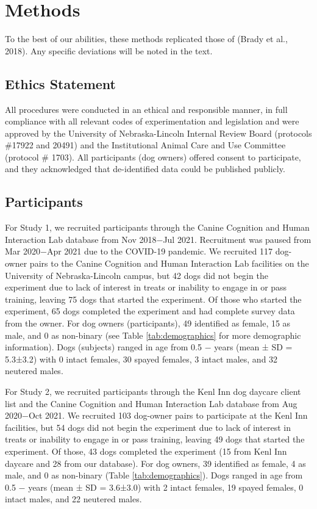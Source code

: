 \documentclass[
  pub,floatsintext]{apa6}
\begin{document}
\hypertarget{methods}{%
\section{Methods}\label{methods}}

To the best of our abilities, these methods replicated those of (Brady et al., 2018). Any specific deviations will be noted in the text.

\hypertarget{ethics-statement}{%
\subsection{Ethics Statement}\label{ethics-statement}}

All procedures were conducted in an ethical and responsible manner, in full compliance with all relevant codes of experimentation and legislation and were approved by the University of Nebraska-Lincoln Internal Review Board (protocols \#17922 and 20491) and the Institutional Animal Care and Use Committee (protocol \# 1703). All participants (dog owners) offered consent to participate, and they acknowledged that de-identified data could be published publicly.

\hypertarget{participants}{%
\subsection{Participants}\label{participants}}

For Study 1, we recruited participants through the Canine Cognition and Human Interaction Lab database from Nov 2018\(-\)Jul 2021. Recruitment was paused from Mar 2020\(-\)Apr 2021 due to the COVID-19 pandemic. We recruited 117 dog-owner pairs to the Canine Cognition and Human Interaction Lab facilities on the University of Nebraska-Lincoln campus, but 42 dogs did not begin the experiment due to lack of interest in treats or inability to engage in or pass training, leaving 75 dogs that started the experiment. Of those who started the experiment, 65 dogs completed the experiment and had complete survey data from the owner. For dog owners (participants), 49 identified as female, 15 as male, and 0 as non-binary (see Table \ref{tab:demographics} for more demographic information). Dogs (subjects) ranged in age from 0.5 \negthickspace \(-\)  years (mean ± SD = 5.3±3.2) with 0 intact females, 30 spayed females, 3 intact males, and 32 neutered males.

For Study 2, we recruited participants through the Kenl Inn dog daycare client list and the Canine Cognition and Human Interaction Lab database from Aug 2020\(-\)Oct 2021. We recruited 103 dog-owner pairs to participate at the Kenl Inn facilities, but 54 dogs did not begin the experiment due to lack of interest in treats or inability to engage in or pass training, leaving 49 dogs that started the experiment. Of those, 43 dogs completed the experiment (15 from Kenl Inn daycare and 28 from our database). For dog owners, 39 identified as female, 4 as male, and 0 as non-binary (Table \ref{tab:demographics}). Dogs ranged in age from 0.5 \negthickspace \(-\)  years (mean ± SD = 3.6±3.0) with 2 intact females, 19 spayed females, 0 intact males, and 22 neutered males.
\end{document}
